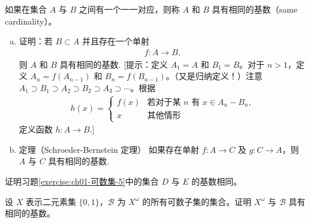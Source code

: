 \documentclass[../../main.tex]{subfiles}
\begin{document}
\begin{exercise}\label{exercise:ch01-可数集-6}
如果在集合 $A$ 与 $B$ 之间有一个一一对应，则称 $A$ 和 $B$ 具有相同的基数（same cardinality）。
\begin{enumerate}[(a)]
\item 证明：若 $B \subset A$ 并且存在一个单射
\begin{align*}
f: A \longrightarrow B,
\end{align*}
则 $A$ 和 $B$ 具有相同的基数. [提示：定义 $A_{1} = A$ 和 $B_{1} = B$。对于 $n > 1$，定义 $A_{n} = f(A_{n-1})$ 和 $B_{n} = f(B_{n-1})$。（又是归纳定义！）注意 $A_{1} \supset B_{1} \supset A_{2} \supset B_{2} \supset A_{3} \supset \cdots$。根据
\begin{align*}
h(x) =
\begin{cases}
f(x) & \text{若对于某 } n \text{ 有 } x \in A_{n} - B_{n},\\
x & \text{其他情形}
\end{cases}
\end{align*}
定义函数 $h: A \longrightarrow B$.]
\item 定理（Schroeder-Bernstein 定理） 如果存在单射 $f: A \longrightarrow C$ 及 $g: C \longrightarrow A$，则 $A$ 与 $C$ 具有相同的基数.
\end{enumerate}
\end{exercise}

\begin{exercise}\label{exercise:ch01-可数集-7}
证明习题\cref{exercise:ch01-可数集-5}中的集合 $D$ 与 $E$ 的基数相同。
\end{exercise}

\begin{exercise}\label{exercise:ch01-可数集-8}
设 $X$ 表示二元素集 $\{0, 1\}$，$\mathscr{B}$ 为 $X^{\omega}$ 的所有可数子集的集合。证明 $X^{\omega}$ 与 $\mathscr{B}$ 具有相同的基数。
\end{exercise}
\end{document}
